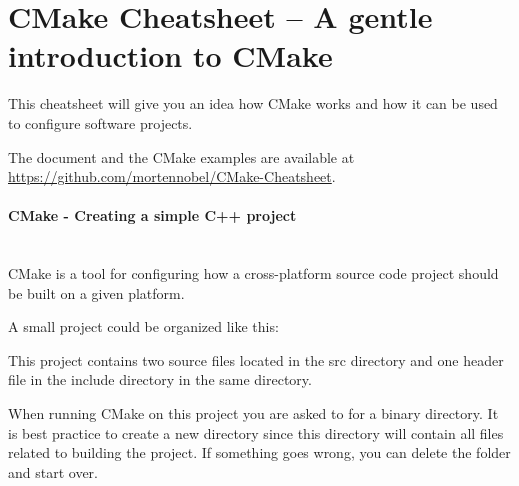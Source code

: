 \documentclass[11pt,a4paper,landscape]{scrartcl} %
\newcommand{\sectiontitle}[1]{\paragraph{#1} \ \\} %
\begin{document}


\section*{CMake Cheatsheet -- A gentle introduction to CMake} %



\setlength{\columnsep}{1.5cm}
\begin{multicols}{2}


This cheatsheet will give you an idea how CMake works and how it can be used to configure software projects.

The document and the CMake examples are available at  \url{https://github.com/mortennobel/CMake-Cheatsheet}. 

\sectiontitle{CMake - Creating a simple C++ project}
			 
CMake is a tool for configuring how a cross-platform source code project should be built on a given platform. 

A small project could be organized like this: 

\vspace{\baselineskip} %

\noindent{}

\vspace{\baselineskip} %

This project contains two source files located in the src directory and one header file in the include directory in the same directory.

When running CMake on this project you are asked to for a binary directory. It is best practice to create a new directory since this directory will contain all files related to building the project. If something goes wrong, you can delete the folder and start over.


\end{multicols}
\end{document}
